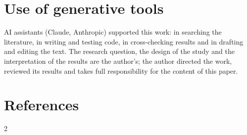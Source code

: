 \documentclass[10pt,a4paper]{article}
\begin{document}
\section*{Use of generative tools}
AI assistants (Claude, Anthropic) supported this work: in searching the literature, in writing and testing code, in cross-checking results and in drafting and editing the text. The research question, the design of the study and the interpretation of the results are the author's; the author directed the work, reviewed its results and takes full responsibility for the content of this paper.

\section*{References}
\renewcommand{\bibsection}{}
\setlength{\columnsep}{14pt}
\begin{multicols}{2}\raggedcolumns


\end{multicols}
\end{document}
